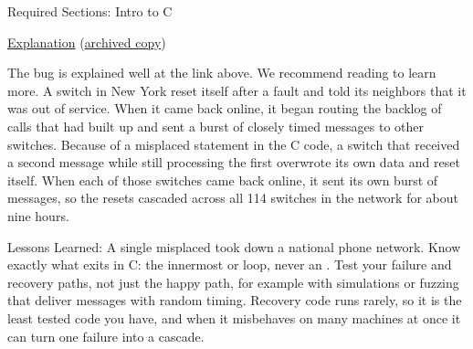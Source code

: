 Required Sections: Intro to C

\href{https://users.csc.calpoly.edu/~jdalbey/SWE/Papers/att_collapse.html}{Explanation} (\href{https://web.archive.org/web/20260610030535/http://users.csc.calpoly.edu/~jdalbey/SWE/Papers/att_collapse.html}{archived copy})

The bug is explained well at the link above.
We recommend reading to learn more.
A switch in New York reset itself after a fault and told its neighbors that it was out of service.
When it came back online, it began routing the backlog of calls that had built up and sent a burst of closely timed messages to other switches.
Because of a misplaced  statement in the C code, a switch that received a second message while still processing the first overwrote its own data and reset itself.
When each of those switches came back online, it sent its own burst of messages, so the resets cascaded across all 114 switches in the network for about nine hours.

Lessons Learned: A single misplaced  took down a national phone network.
Know exactly what  exits in C: the innermost  or loop, never an .
Test your failure and recovery paths, not just the happy path, for example with simulations or fuzzing that deliver messages with random timing.
Recovery code runs rarely, so it is the least tested code you have, and when it misbehaves on many machines at once it can turn one failure into a cascade.
